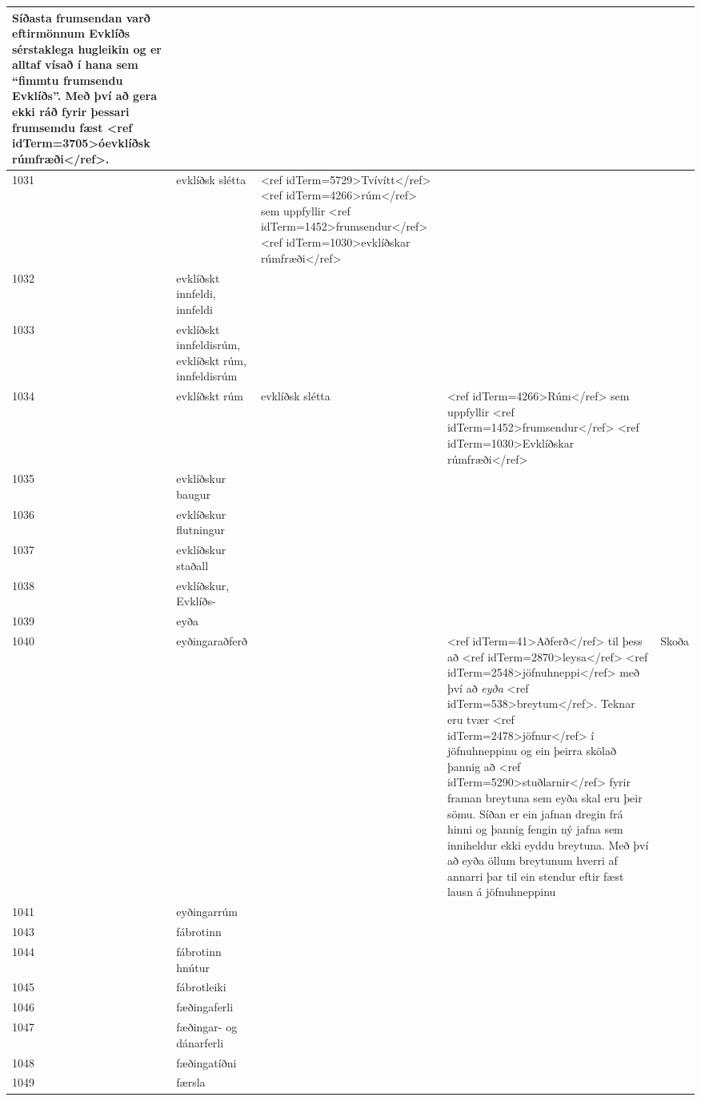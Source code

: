 \begin{longtable}{p{}|p{}|p{}|p{}|p{}}
Síðasta frumsendan varð eftirmönnum Evklíðs sérstaklega hugleikin og er alltaf vísað í hana sem ``fimmtu frumsendu Evklíðs''. Með því að gera ekki ráð fyrir þessari frumsemdu fæst <ref idTerm=3705>óevklíðsk rúmfræði</ref>. & \\
\hline
1031 & evklíðsk slétta & <ref idTerm=5729>Tvívítt</ref> <ref idTerm=4266>rúm</ref> sem uppfyllir <ref idTerm=1452>frumsendur</ref> <ref idTerm=1030>evklíðskar rúmfræði</ref> &  &  \\
\hline
1032 & evklíðskt innfeldi, innfeldi &  &  &  \\
\hline
1033 & evklíðskt innfeldisrúm, evklíðskt rúm, innfeldisrúm &  &  &  \\
\hline
1034 & evklíðskt rúm & evklíðsk slétta & <ref idTerm=4266>Rúm</ref> sem uppfyllir <ref idTerm=1452>frumsendur</ref> <ref idTerm=1030>Evklíðskar rúmfræði</ref>  &  &  \\
\hline
1035 & evklíðskur baugur &  &  &  \\
\hline
1036 & evklíðskur flutningur &  &  &  \\
\hline
1037 & evklíðskur staðall &  &  &  \\
\hline
1038 & evklíðskur, Evklíðs- &  &  &  \\
\hline
1039 & eyða &  &  &  \\
\hline
1040 & eyðingaraðferð & & <ref idTerm=41>Aðferð</ref> til þess að <ref idTerm=2870>leysa</ref> <ref idTerm=2548>jöfnuhneppi</ref> með því að \textit{eyða} <ref idTerm=538>breytum</ref>. Teknar eru tvær <ref idTerm=2478>jöfnur</ref> í jöfnuhneppinu og ein þeirra skölað þannig að <ref idTerm=5290>stuðlarnir</ref> fyrir framan breytuna sem eyða skal eru þeir sömu. Síðan er ein jafnan dregin frá hinni og þannig fengin ný jafna sem inniheldur ekki eyddu breytuna. Með því að eyða öllum breytunum hverri af annarri þar til ein stendur eftir fæst lausn á jöfnuhneppinu & Skoða \\
\hline
1041 & eyðingarrúm &  &  &  \\
\hline
1043 & fábrotinn &  &  &  \\
\hline
1044 & fábrotinn hnútur &  &  &  \\
\hline
1045 & fábrotleiki &  &  &  \\
\hline
1046 & fæðingaferli &  &  &  \\
\hline
1047 & fæðingar- og dánarferli &  &  &  \\
\hline
1048 & fæðingatíðni &  &  &  \\
\hline
1049 & færsla &  &  &  \\

\end{longtable}
